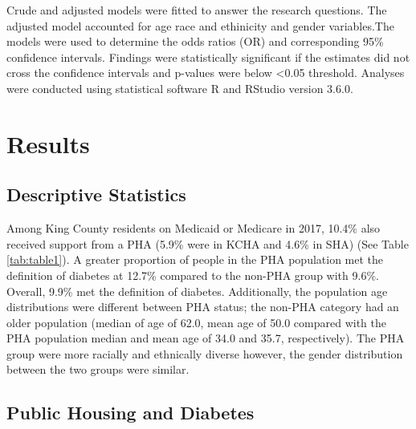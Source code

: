 \documentclass [11pt, proquest] {uwthesis}[2015/03/03]
\begin{document}
Crude and adjusted models were fitted to answer the research questions.
The adjusted model accounted for age race and ethinicity and gender
variables.The models were used to determine the odds ratios (OR) and
corresponding 95\% confidence intervals. Findings were statistically
significant if the estimates did not cross the confidence intervals and
p-values were below \textless{}0.05 threshold. Analyses were conducted
using statistical software R and RStudio version 3.6.0.

\chapter{Results}\label{ref-labels}

\section{Descriptive Statistics}\label{descriptive-statistics}

Among King County residents on Medicaid or Medicare in 2017, 10.4\% also
received support from a PHA (5.9\% were in KCHA and 4.6\% in SHA) (See
Table \ref{tab:table1}). A greater proportion of people in the PHA
population met the definition of diabetes at 12.7\% compared to the
non-PHA group with 9.6\%. Overall, 9.9\% met the definition of diabetes.
Additionally, the population age distributions were different between
PHA status; the non-PHA category had an older population (median of age
of 62.0, mean age of 50.0 compared with the PHA population median and
mean age of 34.0 and 35.7, respectively). The PHA group were more
racially and ethnically diverse however, the gender distribution between
the two groups were similar.

\section{Public Housing and Diabetes}\label{public-housing-and-diabetes}
\end{document}
